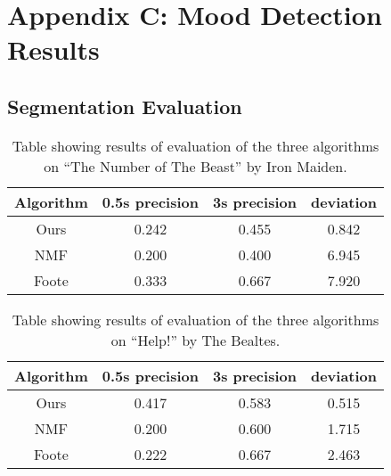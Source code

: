 
\chapter{Appendix C: Mood Detection Results} %

\label{AppendixC} %


\section{Segmentation Evaluation}
\label{sec:segevalapp}

\begin{table}
\begin{center}
\begin{tabular}{| c | c | c | c |} \hline 
Algorithm  &   0.5s precision   	&  3s precision 		&   deviation   	\\ \hline \hline
Ours			& 	0.242				&  0.455				& 	0.842		\\ \hline
NMF			&  0.200				&  0.400				&	6.945		\\ \hline
Foote		&  0.333				&  0.667				& 	7.920		\\ \hline
\end{tabular}
\caption{Table showing results of evaluation of the three algorithms on ``The Number of The Beast'' by Iron Maiden.}
\label{table:evalnumberbeast}
\end{center}
\end{table}

\begin{table}
\begin{center}
\begin{tabular}{| c | c | c | c |} \hline 
Algorithm  &   0.5s precision   	&  3s precision 	&   deviation   	\\ \hline \hline
Ours			& 	0.417				&  0.583			& 	0.515		\\ \hline
NMF			&  0.200				&  0.600			&	1.715		\\ \hline
Foote		&  0.222				&  0.667			& 	2.463		\\ \hline
\end{tabular}
\caption{Table showing results of evaluation of the three algorithms on ``Help!'' by The Bealtes.}
\label{table:evalhelp}
\end{center}
\end{table}

